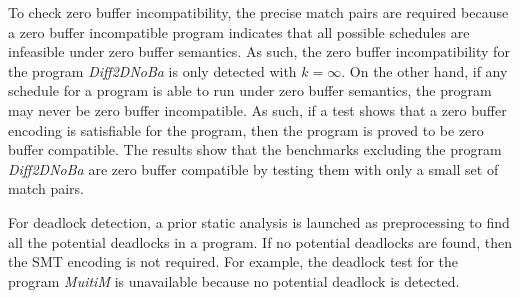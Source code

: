 To check zero buffer incompatibility, the precise match pairs are required because a zero buffer incompatible program indicates that all possible schedules are infeasible under zero buffer semantics. 
As such, the zero buffer incompatibility for the program \textit{Diff2DNoBa} is only detected with $k=\infty$. 
On the other hand, if any schedule for a program is able to run under zero buffer semantics, the program may never be zero buffer incompatible.
As such, if a test shows that a zero buffer encoding is satisfiable for the program, then the program is proved to be zero buffer compatible. 
The results show that the benchmarks excluding the program \textit{Diff2DNoBa} are zero buffer compatible by testing them with only a small set of match pairs.

For deadlock detection, a prior static analysis is launched as preprocessing to find all the potential deadlocks in a program. If no potential deadlocks are found, then the SMT encoding is not required. For example, the deadlock test for the program \textit{MuitiM} is unavailable because no potential deadlock is detected.

